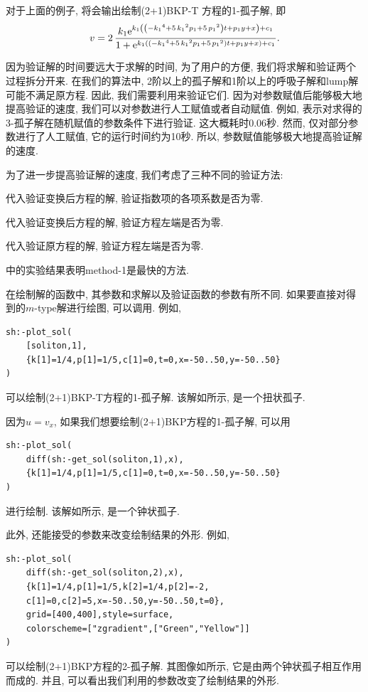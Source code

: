 对于上面的例子, 将会输出绘制(2+1)BKP-T 方程的1-孤子解, 即 
\begin{equation}
v=2\,{\frac {k_{{1}}{{\rm e}^{k_{{1}} \left(  \left( -{k_{{1}}}^{4}+5\,{
k_{{1}}}^{2}p_{{1}}+5\,{p_{{1}}}^{2} \right) t+p_{{1}}y+x \right)+c_1 }}}{
1+{{\rm e}^{k_{{1}} \left(  \left( -{k_{{1}}}^{4}+5\,{k_{{1}}}^{2}p_{{
1}}+5\,{p_{{1}}}^{2} \right) t+p_{{1}}y+x \right)+c_1 }}}}.
\end{equation}

因为验证解的时间要远大于求解的时间, 为了用户的方便, 我们将求解和验证两个过程拆分开来. 在我们的算法中, 2阶以上的孤子解和1阶以上的呼吸子解和lump解可能不满足原方程. 因此, 我们需要利用来验证它们. 因为对参数赋值后能够极大地提高验证的速度, 我们可以对参数进行人工赋值或者自动赋值. 例如,  表示对求得的3-孤子解在随机赋值的参数条件下进行验证. 这大概耗时0.06秒. 然而, 仅对部分参数进行了人工赋值, 它的运行时间约为10秒. 所以, 参数赋值能够极大地提高验证解的速度. 

为了进一步提高验证解的速度, 我们考虑了三种不同的验证方法: 
\begin{compactenum}[method-1:]
\item 代入验证变换后方程的解, 验证指数项的各项系数是否为零.
\item 代入验证变换后方程的解, 验证方程左端是否为零.
\item 代入验证原方程的解, 验证方程左端是否为零.
\end{compactenum}
中的实验结果表明method-1是最快的方法. 

在绘制解的函数中, 其参数和求解以及验证函数的参数有所不同. 如果要直接对得到的$m$-type解进行绘图, 可以调用. 例如, 
\begin{verbatim}
sh:-plot_sol(
    [soliton,1],
    {k[1]=1/4,p[1]=1/5,c[1]=0,t=0,x=-50..50,y=-50..50}
)
\end{verbatim}
可以绘制(2+1)BKP-T方程的1-孤子解. 该解如所示, 是一个扭状孤子.

因为$u=v_x$, 如果我们想要绘制(2+1)BKP方程的1-孤子解, 可以用 
\begin{verbatim}
sh:-plot_sol(
    diff(sh:-get_sol(soliton,1),x),
    {k[1]=1/4,p[1]=1/5,c[1]=0,t=0,x=-50..50,y=-50..50}
)
\end{verbatim} 
进行绘制. 该解如所示, 是一个钟状孤子.

此外, 还能接受的参数来改变绘制结果的外形. 例如, 
\begin{verbatim}
sh:-plot_sol(
    diff(sh:-get_sol(soliton,2),x),
    {k[1]=1/4,p[1]=1/5,k[2]=1/4,p[2]=-2,
    c[1]=0,c[2]=5,x=-50..50,y=-50..50,t=0},
    grid=[400,400],style=surface,
    colorscheme=["zgradient",["Green","Yellow"]]
)
\end{verbatim} 
可以绘制(2+1)BKP方程的2-孤子解. 其图像如所示, 它是由两个钟状孤子相互作用而成的. 并且, 可以看出我们利用的参数改变了绘制结果的外形.

